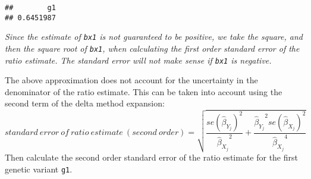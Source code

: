 \documentclass[
]{article}
\newenvironment{Shaded}{\begin{snugshade}}{\end{snugshade}}
\newcommand{\CommentTok}[1]{\textcolor[rgb]{0.56,0.35,0.01}{\textit{#1}}}
\newcommand{\DecValTok}[1]{\textcolor[rgb]{0.00,0.00,0.81}{#1}}
\newcommand{\FunctionTok}[1]{\textcolor[rgb]{0.00,0.00,0.00}{#1}}
\newcommand{\NormalTok}[1]{#1}
\newcommand{\OtherTok}[1]{\textcolor[rgb]{0.56,0.35,0.01}{#1}}
\newcommand{\SpecialCharTok}[1]{\textcolor[rgb]{0.00,0.00,0.00}{#1}}
\begin{document}
\begin{Shaded}
\end{Shaded}

\begin{verbatim}
##        g1 
## 0.6451987
\end{verbatim}

\emph{Since the estimate of \texttt{bx1} is not guaranteed to be
positive, we take the square, and then the square root of \texttt{bx1},
when calculating the first order standard error of the ratio estimate.
The standard error will not make sense if \texttt{bx1} is negative.}

The above approximation does not account for the uncertainty in the
denominator of the ratio estimate. This can be taken into account using
the second term of the delta method expansion:
\[standard\ error\ of\ ratio\ estimate\ (second\ order) =  \sqrt{\frac{se(\hat{\beta}_{Y_{j}})^2}{{\hat{\beta}_{X_{j}}}^2} + \frac{{\hat{\beta}_{Y_{j}}}^2{se(\hat{\beta}_{X_{j}})}^2}{{\hat{\beta}_{X_{j}}}^4}} \]
\vspace{6pt} Then calculate the second order standard error of the ratio
estimate for the first genetic variant \texttt{g1}. \vspace{48pt}

\begin{Shaded}
\end{Shaded}
\end{document}

